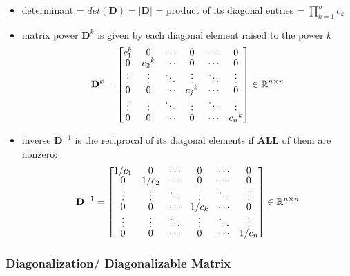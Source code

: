 \begin{itemize}
    \item determinant = $det(\mathbf{D}) = |\mathbf{D}|$ = product of its diagonal entries = $\displaystyle \prod_{k=1}^{n} c_k$

    \item matrix power $\mathbf{D}^k$ is given by each diagonal element raised to the power $k$
    \[
        \displaystyle
        \renewcommand{\arraystretch}{0.6}
        \mathbf{D}^{k} = \begin{bmatrix}
            c_1^k & 0 & \cdots & 0 & \cdots & 0 \\
            0 & {c_2}^k & \cdots & 0 & \cdots & 0 \\
            \vdots & \vdots & \ddots & \vdots & \ddots & \vdots \\
            0 & 0 & \cdots & {c_j}^k & \cdots & 0 \\
            \vdots & \vdots & \ddots & \vdots & \ddots & \vdots \\
            0 & 0 & \cdots & 0 & \cdots & {c_n}^k \\
        \end{bmatrix} \in \mathbb{R}^{n\times n}
    \]

    \item inverse $\mathbf{D}^{-1}$ is the reciprocal of its diagonal elements if \textbf{ALL} of them are nonzero:
    \[
        \displaystyle
        \renewcommand{\arraystretch}{0.6}
        \mathbf{D}^{-1} = \begin{bmatrix}
            {1}/{c_1} & 0 & \cdots & 0 & \cdots & 0 \\
            0 & {1}/{c_2} & \cdots & 0 & \cdots & 0 \\
            \vdots & \vdots & \ddots & \vdots & \ddots & \vdots \\
            0 & 0 & \cdots & {1}/{c_k} & \cdots & 0 \\
            \vdots & \vdots & \ddots & \vdots & \ddots & \vdots \\
            0 & 0 & \cdots & 0 & \cdots & {1}/{c_n} \\
        \end{bmatrix} \in \mathbb{R}^{n\times n}
    \]  
\end{itemize}


\subsubsection{Diagonalization/ Diagonalizable Matrix \cite{mfml-1}} \label{Diagonalization/ Diagonalizable Matrix}

